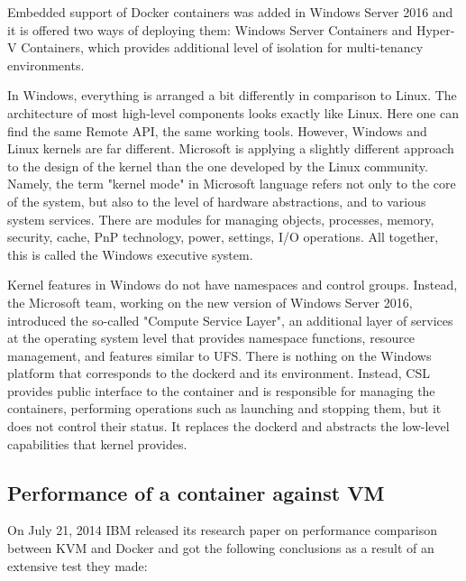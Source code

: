 Embedded support of Docker containers was added in Windows Server 2016 and it
is offered  two ways of  deploying them: Windows Server Containers and
Hyper-V Containers, which provides additional level of
isolation for multi-tenancy environments\cite{DockerOnWindows}.

In Windows, everything is arranged a bit differently in comparison to Linux.
The architecture of most high-level components looks exactly like Linux.
Here one can find the same Remote API, the same working tools.
However, Windows and Linux kernels are far different.
Microsoft is applying a slightly different approach to the design of the
kernel than the one developed by the Linux community.
Namely, the term "kernel mode" in Microsoft language refers not only to the
core of the system, but also to the level of hardware abstractions, and to
various system services.
There are modules for managing objects, processes, memory, security,
cache, PnP technology, power, settings, I/O operations.
All together, this is called the Windows executive system.

Kernel features in Windows do not have namespaces and control groups.
Instead, the Microsoft team, working on the new version of Windows Server 2016,
introduced the
so-called "Compute Service Layer"\cite{DockerOnWindowsMicrosoftBlog},
an additional layer of services at the operating
system level that provides namespace functions, resource management,
and features similar to UFS.
There is nothing on the Windows platform that corresponds
to the dockerd and its environment.
Instead, CSL provides public interface to the container
and is responsible for managing the containers, performing operations
such as launching and stopping them, but it does not control their status.
It replaces the dockerd and
abstracts the low-level capabilities that kernel provides.

\subsection{Performance of a container against VM}

On July 21, 2014 IBM released its research paper
on performance comparison between KVM and Docker
and got the following conclusions as a result of an
extensive test they made\cite{IBMResearchPaperOnPerformance}:


